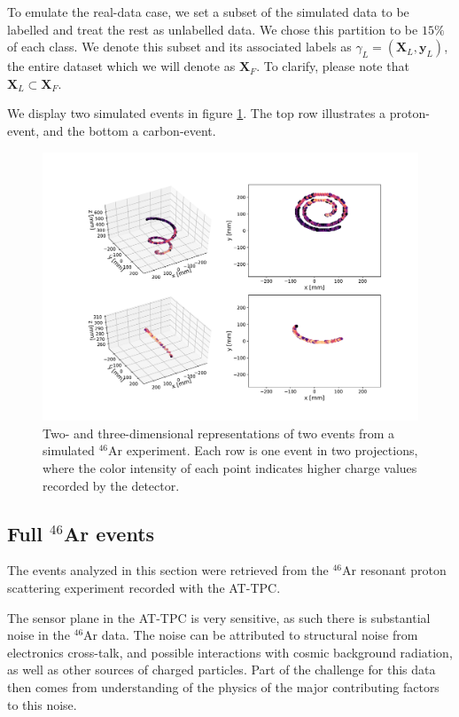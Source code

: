\documentclass[preprint,12pt]{elsarticle}
\begin{document}
To emulate the real-data case, we set a subset of the simulated data to be labelled and treat the rest as unlabelled data. We chose this partition to be $15\%$ of each class. We denote this subset and its associated labels as $\gamma_L=(\boldsymbol{X}_L, \boldsymbol{y}_L)$, the entire dataset which we will denote as $\boldsymbol{X}_F$. To clarify, please note that $\boldsymbol{X}_L \subset \boldsymbol{X}_F$.

We display two simulated events in figure \ref{fig:sim_samples}. The top row illustrates a proton-event, and the bottom a carbon-event. 

\begin{figure}[ht]
\centering
\includegraphics[width=\textwidth]{plots/display_eventssimulated.pdf}
\caption[Displaying simulated events in 2D and 3D]{Two- and three-dimensional representations of two events from a simulated ${}^{46}$Ar experiment. Each row is one event in two projections, where the color intensity of each point indicates higher charge values recorded by the detector.}\label{fig:sim_samples}
\end{figure}


\subsection{Full \texorpdfstring{${}^{46}$Ar}{46Ar}  events}\label{sec:data_real}

The events analyzed in this section were retrieved from the ${}^{46}$Ar resonant proton scattering experiment recorded with the AT-TPC. 

The sensor plane in the AT-TPC is very sensitive, as such there is substantial noise in the ${}^{46}$Ar data. The noise can be attributed to structural noise from electronics cross-talk, and possible interactions with cosmic background radiation, as well as other sources of charged particles. Part of the challenge for this data then comes from understanding of the physics of the major contributing factors to this noise. 
\end{document}
